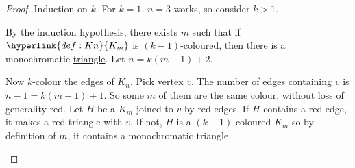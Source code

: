 \documentclass{article}
\newcommand{\red}[1]{\textcolor{bred}{#1}}
\begin{document}
\begin{proof}
    Induction on $k$. For $k=1$, $n=3$ works, so consider $k>1$.

    By the induction hypothesis, there exists $m$ such that if $\hyperlink{def:Kn}{K_m}$ is $(k-1)$-coloured, then there is a monochromatic \hyperlink{def:triangle}{triangle}.  Let $n = k(m-1) + 2$.

    Now $k$-colour the edges of $K_n$.  Pick vertex $v$.
    The number of edges containing $v$ is $n-1 = k(m-1)+1$.  So some $m$ of them are the same colour, without loss of generality \red{red}.
    Let $H$ be a $K_m$ joined to $v$ by \red{red edges}. If $H$ contains a \red{red edge}, it makes a \red{red triangle} with $v$.
    If not, $H$ is a $(k-1)$-coloured $K_m$ so by definition of $m$, it contains a monochromatic triangle.
    \begin{center}
    \end{center}
\end{proof}
\end{document}
